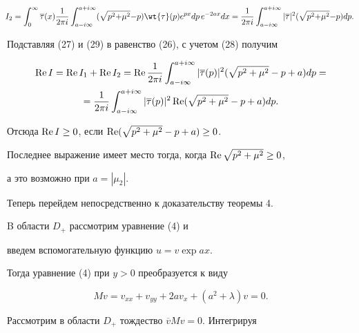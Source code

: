 \begin{pf}
\begin{equation}


\negthickspace I_2=\int_0^{\infty }\overline {\tau }(x)


\frac {1}{2\pi i}\int_{a-i\infty }^{a+i\infty}


(\sqrt {p^2{+} \mu ^2}{-}p)\wt {\tau }(p)e^{px}dp\,e^{-2ax}dx= 


\frac {1}{2\pi i}\int_{a-i\infty }^{a+i\infty }


|\overline {\tau }|^2


(\sqrt {p^2{+}\mu ^2}{-}p)dp.


\end{equation}


Подставляя (27) и (29) в равенство (26), с учетом (28) получим


\begin{multline*}


\re I=\re I_1+\re I_2=\re\frac {1}{2\pi i}\int_{a-i\infty }^{a+i\infty }


|\overline {\tau }(p)|^2(\sqrt {p^2+\mu ^2}-p+a)dp=\\


%


=\frac {1}{2\pi i}\int_{a-i\infty }^{a+i\infty }


|\overline {\tau }(p)|^2\re(\sqrt {p^2+\mu ^2}-p+a)dp.


\end{multline*}


Отсюда $\operatorname{Re} I\ge 0$, если $\operatorname{Re}(\sqrt {p^2+\mu ^2}-p+a)\ge 0$.


Последнее выражение имеет место тогда, когда $\operatorname{Re}\sqrt {p^2+\mu ^2}\ge 0$,


а это возможно при $a=|\mu_2|$.


\end{pf}





Теперь перейдем непосредственно к доказательству теоремы 4.


B области $D_+$ рассмотрим уравнение (4) и


введем вспомогательную функцию $u=v\exp ax$.


Тогда уравнение (4) при $y>0$ преобразуется к виду


$$


Mv=v_{xx}+v_{yy}+2av_x+(a^2+\lambda )v=0.


$$


Рассмотрим в области $D_+$ тождество $\overline v Mv=0$. Интегрируя 


